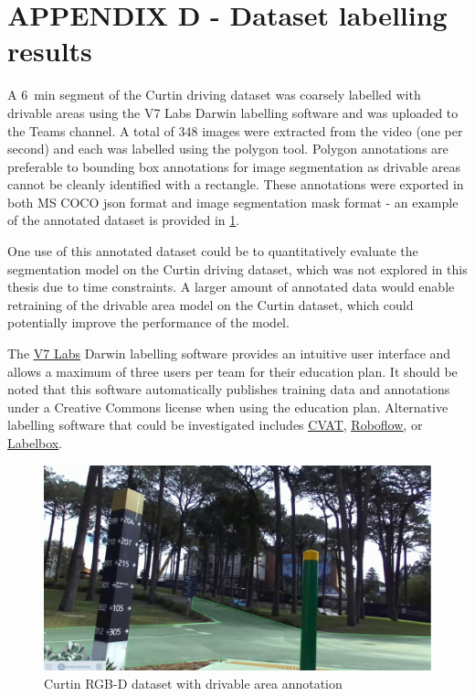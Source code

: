 \section*{APPENDIX D - Dataset labelling results}
A \SI{6}{\minute} segment of the Curtin driving dataset was coarsely labelled with drivable areas using
the V7 Labs Darwin labelling software and was uploaded to the Teams channel. A total of 348 images
were extracted from the video (one per second) and each was labelled using the polygon tool.
Polygon annotations are preferable to bounding box annotations for image segmentation
as drivable areas cannot be cleanly identified with a rectangle. These annotations
were exported in both MS COCO json format and image segmentation mask format - an example of
the annotated dataset is provided in \cref{fig:curtin_annotated}.

One use of this annotated dataset could be to quantitatively evaluate the segmentation model on
the Curtin driving dataset, which was not explored in this thesis due to time constraints.
A larger amount of annotated data would enable retraining of the drivable area model
on the Curtin dataset, which could potentially improve the performance of the model.

The \href{https://www.v7labs.com/}{\underline{V7 Labs}} Darwin labelling software provides an
intuitive user interface and allows a maximum of three users per team for their education plan.
It should be noted that this software automatically publishes training data and annotations under a Creative Commons
license when using the education plan. Alternative labelling software that
could be investigated includes \href{https://www.cvat.ai/}{\underline{CVAT}}, \href{https://roboflow.com/}{\underline{Roboflow}},
or \href{https://labelbox.com/}{\underline{Labelbox}}.

\begin{figure}[b]
    \centering
    \includegraphics[width=\linewidth]{images/curtin_annotated.jpg}
    \caption{Curtin RGB-D dataset with drivable area annotation}
    \label{fig:curtin_annotated}
\end{figure}
